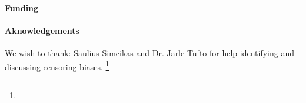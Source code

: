 \maketitle
\begin{abstract}
  
\end{abstract}
\paragraph{Funding}
\paragraph{Aknowledgements}
We wish to thank:
Saulius Simcikas and Dr. Jarle Tufto
for help identifying and discussing censoring biases.%
\footnote{}
\clearpage